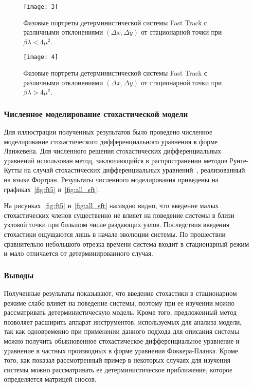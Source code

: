 \documentclass[floatfix,
showkeys,
twocolumn, nofootinbib, superscriptaddress, ]{revtex4-1}
\begin{document}
\begin{figure}\centering
  \texttt{[image: 3]}
    \caption{Фазовые портреты детерминистической системы Fast Track с
      различными отклонениями $(\Delta x, \Delta y)$ от стационарной
      точки при $\beta \lambda < 4\mu^2$.}
  \label{fig:ft3}
\end{figure}

\begin{figure}\centering
  \texttt{[image: 4]}
    \caption{ Фазовые портреты детерминистической системы Fast Track с
      различными отклонениями $(\Delta x, \Delta y)$ от стационарной
      точки при $\beta \lambda > 4\mu^2$.}
  \label{fig:ft4}
\end{figure}

  \subsubsection{Численное моделирование стохастической модели}

  Для иллюстрации полученных результатов было проведено численное
  моделирование стохастического дифференциального уравнения в форме
  Ланжевена. Для численного решения стохастических дифференциальных
  уравнений использован метод, заключающийся в распространении методов
  Рунге-Кутты на случай стохастических дифференциальных
  уравнений~\cite{L_lit04, L_lit01}, реализованный на языке
  Фортран. Результаты численного моделирования приведены на
  графиках~\ref{fig:ft5} и~\ref{fig:all_sft}.

  На рисунках~\ref{fig:ft5} и~\ref{fig:all_sft} наглядно видно, что
  введение малых стохастических членов существенно не влияет на
  поведение системы в близи узловой точки при большом числе раздающих
  узлов. Последствия введения стохастики ощущаются лишь в начале
  эволюции системы. По прошествии сравнительно небольшого отрезка
  времени система входит в стационарный режим и мало отличается от
  детерминированного случая.

\subsubsection{Выводы}

  Полученные результаты показывают, что введение стохастики в
  стационарном режиме слабо влияет на поведение системы, поэтому при
  ее изучении можно рассматривать детерминистическую модель. Кроме
  того, предложенный метод позволяет расширить аппарат инструментов,
  используемых для анализа модели, так как одновременно при применении
  данного подхода для описания системы можно получить обыкновенное
  стохастическое дифференциальное уравнение и уравнение в частных
  производных в форме уравнения Фоккера-Планка. Кроме того, как
  показал рассмотренный пример в некоторых случаях для изучения
  системы можно рассматривать ее детерминистическое приближение,
  которое определяется матрицей сносов.
\end{document}
